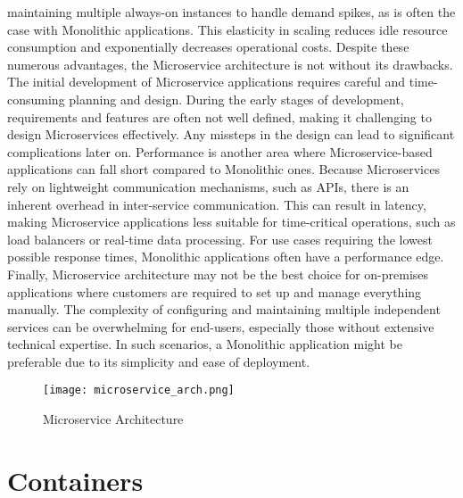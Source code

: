maintaining multiple always-on instances to handle demand spikes, as is often the case with Monolithic applications. This elasticity in scaling reduces idle resource consumption and exponentially decreases operational costs. Despite these numerous advantages, the Microservice architecture is not without its drawbacks. The initial development of Microservice applications requires careful and time-consuming planning and design. During the early stages of development, requirements and features are often not well defined, making it challenging to design Microservices effectively. Any missteps in the design can lead to significant complications later on. Performance is another area where Microservice-based applications can fall short compared to Monolithic ones. Because Microservices rely on lightweight communication mechanisms, such as APIs, there is an inherent overhead in inter-service communication. This can result in latency, making Microservice applications less suitable for time-critical operations, such as load balancers or real-time data processing. For use cases requiring the lowest possible response times, Monolithic applications often have a performance edge. Finally, Microservice architecture may not be the best choice for on-premises applications where customers are required to set up and manage everything manually. The complexity of configuring and maintaining multiple independent services can be overwhelming for end-users, especially those without extensive technical expertise. In such scenarios, a Monolithic application might be preferable due to its simplicity and ease of deployment\cite{whenmicroarebad}.

\begin{figure}[!h]
    \graphicspath{ {./diagrams/} }
    \texttt{[image: microservice\_arch.png]}
    \centering
    \caption{Microservice Architecture}
    \label{fig:micro_arch}
\end{figure}

\section{Containers}

